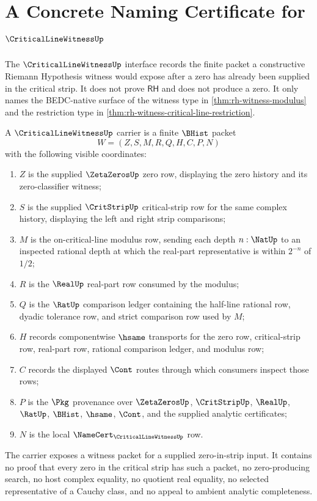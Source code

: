 \chapter{A Concrete Naming Certificate for $\CriticalLineWitnessUp$}
\label{ch:concrete-instances-criticallinewitness-namecert}

The $\CriticalLineWitnessUp$ interface records the finite packet a constructive Riemann Hypothesis witness would expose after a zero has already been supplied in the critical strip. It does not prove $\mathsf{RH}$ and does not produce a zero. It only names the BEDC-native surface of the witness type in \autoref{thm:rh-witness-modulus} and the restriction type in \autoref{thm:rh-witness-critical-line-restriction}.

\begin{definition}
\label{def:critical-line-witness-carrier}
A $\CriticalLineWitnessUp$ carrier is a finite $\BHist$ packet
$$
W=(Z,S,M,R,Q,H,C,P,N)
$$
with the following visible coordinates:
\begin{enumerate}
\item $Z$ is the supplied $\ZetaZerosUp$ zero row, displaying the zero history and its zero-classifier witness;
\item $S$ is the supplied $\CritStripUp$ critical-strip row for the same complex history, displaying the left and right strip comparisons;
\item $M$ is the on-critical-line modulus row, sending each depth $n:\NatUp$ to an inspected rational depth at which the real-part representative is within $2^{-n}$ of $1/2$;
\item $R$ is the $\RealUp$ real-part row consumed by the modulus;
\item $Q$ is the $\RatUp$ comparison ledger containing the half-line rational row, dyadic tolerance row, and strict comparison row used by $M$;
\item $H$ records componentwise $\hsame$ transports for the zero row, critical-strip row, real-part row, rational comparison ledger, and modulus row;
\item $C$ records the displayed $\Cont$ routes through which consumers inspect those rows;
\item $P$ is the $\Pkg$ provenance over $\ZetaZerosUp$, $\CritStripUp$, $\RealUp$, $\RatUp$, $\BHist$, $\hsame$, $\Cont$, and the supplied analytic certificates;
\item $N$ is the local $\NameCert_{\CriticalLineWitnessUp}$ row.
\end{enumerate}
The carrier exposes a witness packet for a supplied zero-in-strip input. It contains no proof that every zero in the critical strip has such a packet, no zero-producing search, no host complex equality, no quotient real equality, no selected representative of a Cauchy class, and no appeal to ambient analytic completeness.
\end{definition}

